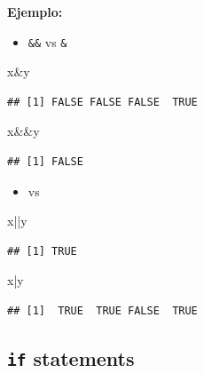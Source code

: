 \documentclass[]{article}
\def\tightlist{}
\newenvironment{Shaded}{\begin{snugshade}}{\end{snugshade}}
\newcommand{\NormalTok}[1]{{#1}}
\numberwithin{equation}{section}
\begin{document}
\textbf{Ejemplo:}

\begin{itemize}
\tightlist
\item
  \texttt{\&\&} vs \texttt{\&}
\end{itemize}

\begin{Shaded}
\begin{Highlighting}[]
\NormalTok{x&y}
\end{Highlighting}
\end{Shaded}

\begin{verbatim}
## [1] FALSE FALSE FALSE  TRUE
\end{verbatim}

\begin{Shaded}
\begin{Highlighting}[]
\NormalTok{x&&y}
\end{Highlighting}
\end{Shaded}

\begin{verbatim}
## [1] FALSE
\end{verbatim}

\begin{itemize}
\tightlist
\item
  \texttt{\textbar{}\textbar{}} vs \texttt{\textbar{}}
\end{itemize}

\begin{Shaded}
\begin{Highlighting}[]
\NormalTok{x||y}
\end{Highlighting}
\end{Shaded}

\begin{verbatim}
## [1] TRUE
\end{verbatim}

\begin{Shaded}
\begin{Highlighting}[]
\NormalTok{x|y}
\end{Highlighting}
\end{Shaded}

\begin{verbatim}
## [1]  TRUE  TRUE FALSE  TRUE
\end{verbatim}

\subsection{\texorpdfstring{\texttt{if}
statements}{if statements}}\label{if-statements}
\end{document}
